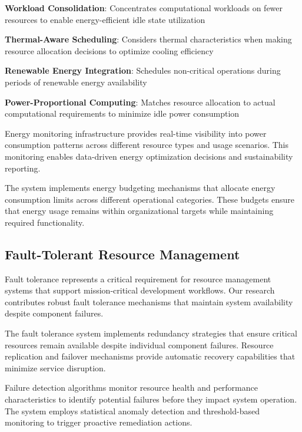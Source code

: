 \begin{expandedlist}
    \item \textbf{Workload Consolidation}: Concentrates computational workloads on fewer resources to enable energy-efficient idle state utilization
    \item \textbf{Thermal-Aware Scheduling}: Considers thermal characteristics when making resource allocation decisions to optimize cooling efficiency
    \item \textbf{Renewable Energy Integration}: Schedules non-critical operations during periods of renewable energy availability
    \item \textbf{Power-Proportional Computing}: Matches resource allocation to actual computational requirements to minimize idle power consumption
\end{expandedlist}

Energy monitoring infrastructure provides real-time visibility into power consumption patterns across different resource types and usage scenarios. This monitoring enables data-driven energy optimization decisions and sustainability reporting.

The system implements energy budgeting mechanisms that allocate energy consumption limits across different operational categories. These budgets ensure that energy usage remains within organizational targets while maintaining required functionality.

\subsection*{Fault-Tolerant Resource Management}

Fault tolerance represents a critical requirement for resource management systems that support mission-critical development workflows. Our research contributes robust fault tolerance mechanisms that maintain system availability despite component failures.

The fault tolerance system implements redundancy strategies that ensure critical resources remain available despite individual component failures. Resource replication and failover mechanisms provide automatic recovery capabilities that minimize service disruption.

Failure detection algorithms monitor resource health and performance characteristics to identify potential failures before they impact system operation. The system employs statistical anomaly detection and threshold-based monitoring to trigger proactive remediation actions.

